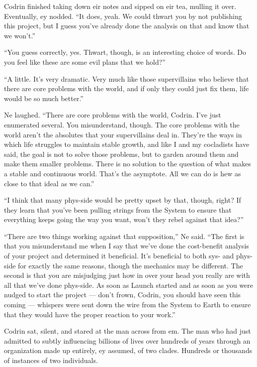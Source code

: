 Codrin finished taking down eir notes and sipped on eir tea, mulling it over. Eventually, ey nodded. ``It does, yeah. We could thwart you by not publishing this project, but I guess you've already done the analysis on that and know that we won't.''

``You guess correctly, yes. Thwart, though, is an interesting choice of words. Do you feel like these are some evil plans that we hold?''

``A little. It's very dramatic. Very much like those supervillains who believe that there are core problems with the world, and if only they could just fix them, life would be so much better.''

Ne laughed. ``There are core problems with the world, Codrin. I've just enumerated several. You misunderstand, though. The core problems with the world aren't the absolutes that your supervillains deal in. They're the ways in which life struggles to maintain stable growth, and like I and my cocladists have said, the goal is not to solve those problems, but to garden around them and make them smaller problems. There is no solution to the question of what makes a stable and continuous world. That's the asymptote. All we can do is hew as close to that ideal as we can.''

``I think that many phys-side would be pretty upset by that, though, right? If they learn that you've been pulling strings from the System to ensure that everything keeps going the way you want, won't they rebel against that idea?''

``There are two things working against that supposition,'' Ne said. ``The first is that you misunderstand me when I say that we've done the cost-benefit analysis of your project and determined it beneficial. It's beneficial to both sys- and phys-side for exactly the same reasons, though the mechanics may be different. The second is that you are misjudging just how in over your head you really are with all that we've done phys-side. As soon as Launch started and as soon as you were nudged to start the project — don't frown, Codrin, you should have seen this coming — whispers were sent down the wire from the System to Earth to ensure that they would have the proper reaction to your work.''

Codrin sat, silent, and stared at the man across from em. The man who had just admitted to subtly influencing billions of lives over hundreds of years through an organization made up entirely, ey assumed, of two clades. Hundreds or thousands of instances of two individuals.


